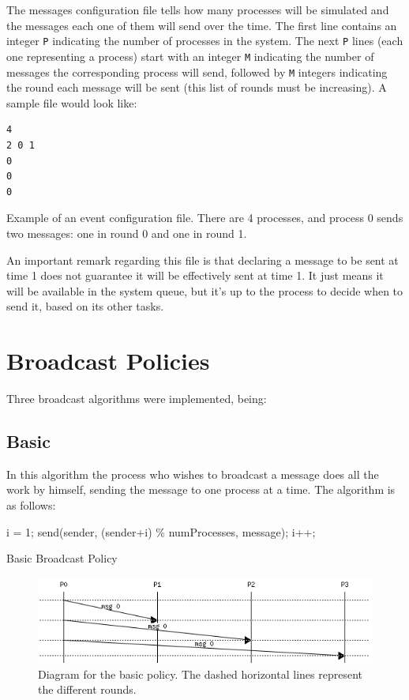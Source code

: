 \documentclass[a4paper, 11pt]{article}
\begin{document}
	The messages configuration file tells how many processes will be simulated and the messages each one of them will send over the time. The first line contains an integer \texttt{P} indicating the number of processes in the system. The next \texttt{P} lines (each one representing a process) start with an integer \texttt{M} indicating the number of messages the corresponding process will send, followed by \texttt{M} integers indicating the round each message will be sent (this list of rounds must be increasing). A sample file would look like:

\begin{file}
\begin{verbatim}
4
2 0 1
0
0
0
\end{verbatim}
\caption{Example of an event configuration file. There are 4 processes, and process 0 sends two messages: one in round 0 and one in round 1.}
\end{file}

	An important remark regarding this file is that declaring a message to be sent at time 1 does not guarantee it will be effectively sent at time 1. It just means it will be available in the system queue, but it’s up to the process to decide when to send it, based on its other tasks.
	
\newpage
\section{Broadcast Policies}
\label{sec:policies}
	Three broadcast algorithms were implemented, being: 

\subsection{Basic}
	In this algorithm the process who wishes to broadcast a message does all the work by himself, sending the message to one process at a time. The algorithm is as follows:

\begin{algorithm}
\begin{algorithmic}
	\State i = 1;
		\State send(sender, (sender+i) \% numProcesses, message);
		\State i++;
	\EndWhile
\EndFunction
\end{algorithmic}
\caption{Basic Broadcast Policy}
\end{algorithm}

\begin{figure}[H]
	\centering
	\includegraphics[scale=0.9]{basic.PNG}
	\caption{Diagram for the basic policy. The dashed horizontal lines represent the different rounds.}
	\label{fig:diagramBasic}
\end{figure}
\end{document}
